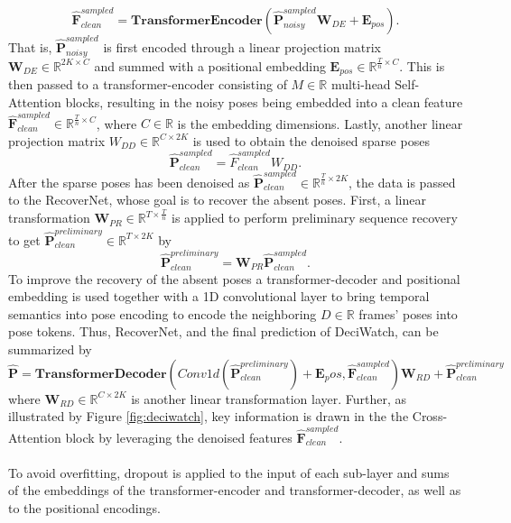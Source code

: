 \documentclass[./main.tex]{subfiles}
\begin{document}
\begin{equation}
    \hat{\bm{F}}_{clean} ^{sampled} = \textbf{TransformerEncoder} \left( \hat{\bm{P}}_{noisy} ^{sampled} \bm{W}_{DE} + \bm{E}_{pos} \right).
\end{equation}
That is, $\hat{\bm{P}}_{noisy} ^{sampled}$ is first encoded through a linear projection matrix $\bm{W}_{DE} \in \mathbb{R}^{2K \times C}$ and summed with a positional embedding $\bm{E}_{pos} \in \mathbb{R}^{\frac{T}{n} \times C}$. This is then passed to a transformer-encoder consisting of $M \in \mathbb{R}$ multi-head Self-Attention blocks, resulting in the noisy poses being embedded into a clean feature $\hat{\bm{F}}_{clean} ^{sampled} \in \mathbb{R}^{\frac{T}{n} \times C}$, where $C \in \mathbb{R}$ is the embedding dimensions. Lastly, another linear projection matrix $W_{DD} \in \mathbb{R}^{C \times 2K}$ is used to obtain the denoised sparse poses
\begin{equation}
    \hat{\bm{P}}_{clean} ^{sampled} = \hat{F}_{clean} ^{sampled} W_{DD}.
\end{equation}
After the sparse poses has been denoised as $\hat{\bm{P}}_{clean} ^{sampled} \in \mathbb{R}^{\frac{T}{n} \times 2K}$, the data is passed to the RecoverNet, whose goal is to recover the absent poses. First, a linear transformation $\bm{W}_{PR} \in \mathbb{R}^{T \times \frac{T}{n}}$ is applied to perform preliminary sequence recovery to get $\hat{\bm{P}}_{clean} ^{preliminary} \in \mathbb{R}^{T \times 2K}$ by
\begin{equation}
    \hat{\bm{P}}_{clean} ^{preliminary} = \bm{W}_{PR} \hat{\bm{P}}_{clean} ^{sampled}.
\end{equation}
To improve the recovery of the absent poses a transformer-decoder and positional embedding is used together with a 1D convolutional layer to bring temporal semantics into pose encoding to encode the neighboring $D \in \mathbb{R}$ frames' poses into pose tokens. Thus, RecoverNet, and the final prediction of DeciWatch, can be summarized by
\begin{equation}
    \hat{\bm{P}} = \textbf{TransformerDecoder}\left(Conv1d \left( \hat{\bm{P}}_{clean} ^{preliminary} \right) + \bm{E}_pos, \hat{\bm{F}}_{clean} ^{sampled} \right)\bm{W}_{RD} + \hat{\bm{P}}_{clean} ^{preliminary}
\end{equation}
where $\bm{W}_{RD} \in \mathbb{R}^{C \times 2K}$ is another linear transformation layer. Further, as illustrated by Figure \ref{fig:deciwatch}, key information is drawn in the the Cross-Attention block by leveraging the denoised features $\hat{\bm{F}}_{clean} ^{sampled}$.
\\
\\
To avoid overfitting, dropout is applied to the input of each sub-layer and sums of the embeddings of the transformer-encoder and transformer-decoder, as well as to the positional encodings.
\end{document}
